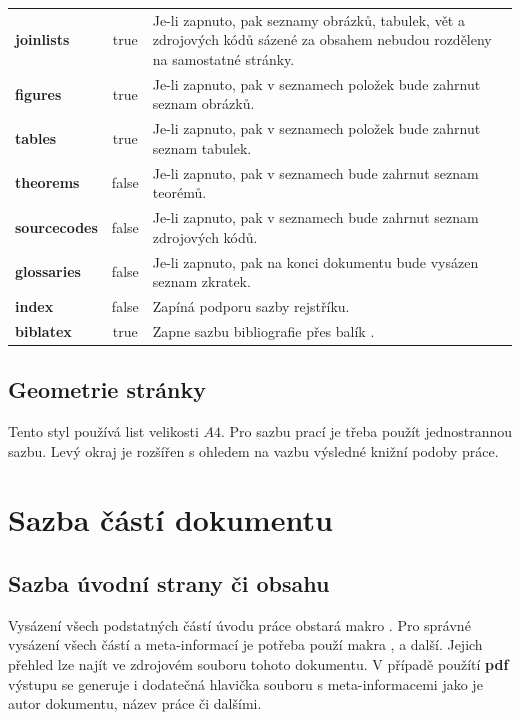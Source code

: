 \documentclass[
  field=inf,
  biblatex,
  glossaries,
  index
]{kidiplom}
\begin{document}
\begin{table}
\begin{center}
{\begin{tabular}{>{\bfseries}l >{\ttfamily}c L{8cm}}

joinlists & true & Je-li zapnuto, pak seznamy obrázků, tabulek, vět a
zdrojových kódů sázené za obsahem nebudou rozděleny na samostatné stránky. \\

figures & true & Je-li zapnuto, pak v seznamech položek bude zahrnut seznam obrázků. \\

tables & true & Je-li zapnuto, pak v seznamech položek bude zahrnut seznam tabulek. \\

theorems & false & Je-li zapnuto, pak v seznamech bude zahrnut seznam teorémů. \\

sourcecodes & false & Je-li zapnuto, pak v seznamech bude zahrnut seznam zdrojových kódů. \\

glossaries & false & Je-li zapnuto, pak na konci dokumentu bude vysázen seznam zkratek. \\

index & false & Zapíná podporu sazby rejstříku. \\

biblatex & true & Zapne sazbu bibliografie přes balík \BibLaTeX{}.
\end{tabular}}
\end{center}
\end{table}

\subsection{Geometrie stránky}
Tento styl používá list velikosti $A4$. Pro sazbu prací je třeba použít jednostrannou sazbu. Levý okraj je rozšířen s ohledem na vazbu výsledné knižní podoby práce.

\section{Sazba částí dokumentu}
\subsection{Sazba úvodní strany či obsahu}
Vysázení všech podstatných částí úvodu práce obstará makro . Pro správné vysázení všech částí a meta-informací je potřeba použí makra ,  a další. Jejich přehled lze najít ve zdrojovém souboru tohoto dokumentu. V případě použítí \textbf{pdf} výstupu se generuje i dodatečná hlavička souboru s meta-informacemi jako je autor dokumentu, název práce či dalšími.
\end{document}
